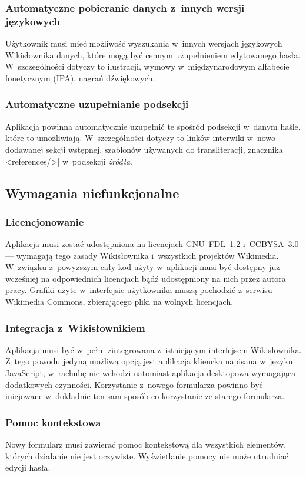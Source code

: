 \subsubsection{Automatyczne pobieranie danych z~innych wersji językowych}
Użytkownik musi mieć możliwość wyszukania w~innych wersjach językowych Wikisłownika danych, które mogą być cennym uzupełnieniem edytowanego hasła. W~szczególności dotyczy to ilustracji, wymowy w~międzynarodowym alfabecie fonetycznym (IPA), nagrań dźwiękowych.%

\subsubsection{Automatyczne uzupełnianie podsekcji}
Aplikacja powinna automatycznie uzupełnić te spośród podsekcji w~danym haśle, które to umożliwiają. W~szczególności dotyczy to linków interwiki w~nowo dodawanej sekcji wstępnej, szablonów używanych do transliteracji, znacznika \kod|<references/>| w~podsekcji \emph{źródła}.%

\subsection{Wymagania niefunkcjonalne}
\subsubsection{Licencjonowanie}
Aplikacja musi zostać udostępniona na licencjach GNU~FDL~1.2 i~CC\dywiz{}BY\dywiz{}SA~3.0 --- wymagają tego zasady Wikisłownika i~wszystkich projektów Wikimedia. W~związku z~powyższym cały kod użyty w~aplikacji musi być dostępny już wcześniej na odpowiednich licencjach bądź udostępniony na nich przez autora pracy. Grafiki użyte w~interfejsie użytkownika muszą pochodzić z~serwisu Wikimedia Commons, zbierającego pliki na wolnych licencjach.

\subsubsection{Integracja z~Wikisłownikiem}
Aplikacja musi być w~pełni zintegrowana z~istniejącym interfejsem Wikisłownika. Z~tego powodu jedyną możliwą opcją jest aplikacja kliencka napisana w~języku JavaScript, w~rachubę nie wchodzi natomiast aplikacja desktopowa wymagająca dodatkowych czynności. Korzystanie z~nowego formularza powinno być inicjowane w~dokładnie ten sam sposób co korzystanie ze starego formularza.

\subsubsection{Pomoc kontekstowa}
Nowy formularz musi zawierać pomoc kontekstową dla wszystkich elementów, których działanie nie jest oczywiste. Wyświetlanie pomocy nie może utrudniać edycji hasła.

